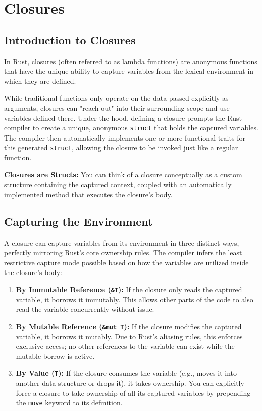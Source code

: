 \chapter{Closures}

\section{Introduction to Closures}
In Rust, closures (often referred to as lambda functions) are anonymous functions that have the unique ability to capture variables from the lexical environment in which they are defined. 

While traditional functions only operate on the data passed explicitly as arguments, closures can "reach out" into their surrounding scope and use variables defined there. Under the hood, defining a closure prompts the Rust compiler to create a unique, anonymous \texttt{struct} that holds the captured variables. The compiler then automatically implements one or more functional traits for this generated \texttt{struct}, allowing the closure to be invoked just like a regular function.

\begin{insightbox}
\textbf{Closures are Structs:} You can think of a closure conceptually as a custom structure containing the captured context, coupled with an automatically implemented method that executes the closure's body.
\end{insightbox}

\section{Capturing the Environment}
A closure can capture variables from its environment in three distinct ways, perfectly mirroring Rust's core ownership rules. The compiler infers the least restrictive capture mode possible based on how the variables are utilized inside the closure's body:

\begin{enumerate}
    \item \textbf{By Immutable Reference (\texttt{\&T}):} If the closure only reads the captured variable, it borrows it immutably. This allows other parts of the code to also read the variable concurrently without issue.
    \item \textbf{By Mutable Reference (\texttt{\&mut T}):} If the closure modifies the captured variable, it borrows it mutably. Due to Rust's aliasing rules, this enforces exclusive access; no other references to the variable can exist while the mutable borrow is active.
    \item \textbf{By Value (\texttt{T}):} If the closure consumes the variable (e.g., moves it into another data structure or drops it), it takes ownership. You can explicitly force a closure to take ownership of all its captured variables by prepending the \texttt{move} keyword to its definition.
\end{enumerate}

